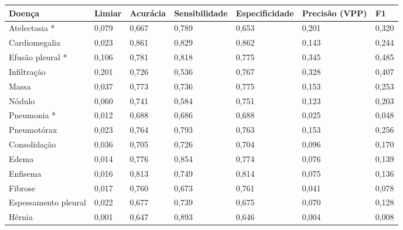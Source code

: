 \begin{tabular}{lllllll}
\toprule
Doença & Limiar & Acurácia & Sensibilidade & Especificidade & Precisão (VPP) & F1 \\
\midrule
Atelectasia * & 0,079 & 0,667 & 0,789 & 0,653 & 0,201 & 0,320 \\
Cardiomegalia & 0,023 & 0,861 & 0,829 & 0,862 & 0,143 & 0,244 \\
Efusão pleural * & 0,106 & 0,781 & 0,818 & 0,775 & 0,345 & 0,485 \\
Infiltração & 0,201 & 0,726 & 0,536 & 0,767 & 0,328 & 0,407 \\
Massa & 0,037 & 0,773 & 0,736 & 0,775 & 0,153 & 0,253 \\
Nódulo & 0,060 & 0,741 & 0,584 & 0,751 & 0,123 & 0,203 \\
Pneumonia * & 0,012 & 0,688 & 0,686 & 0,688 & 0,025 & 0,048 \\
Pneumotórax & 0,023 & 0,764 & 0,793 & 0,763 & 0,153 & 0,256 \\
Consolidação & 0,036 & 0,705 & 0,726 & 0,704 & 0,096 & 0,170 \\
Edema & 0,014 & 0,776 & 0,854 & 0,774 & 0,076 & 0,139 \\
Enfisema & 0,016 & 0,813 & 0,749 & 0,814 & 0,075 & 0,136 \\
Fibrose & 0,017 & 0,760 & 0,673 & 0,761 & 0,041 & 0,078 \\
Espessamento pleural & 0,022 & 0,677 & 0,739 & 0,675 & 0,070 & 0,128 \\
Hérnia & 0,001 & 0,647 & 0,893 & 0,646 & 0,004 & 0,008 \\
\bottomrule
\end{tabular}
